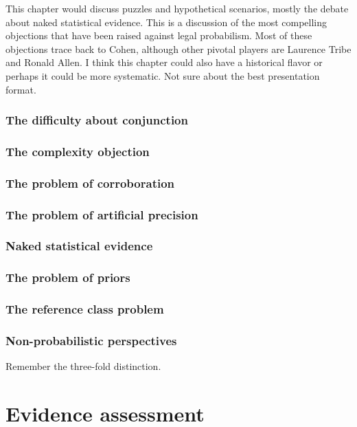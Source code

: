 \documentclass[]{book}
\begin{document}
This chapter would discuss puzzles and hypothetical scenarios, mostly
the debate about naked statistical evidence. This is a discussion of the
most compelling objections that have been raised against legal
probabilism. Most of these objections trace back to Cohen, although
other pivotal players are Laurence Tribe and Ronald Allen. I think this
chapter could also have a historical flavor or perhaps it could be more
systematic. Not sure about the best presentation format.

\section{The difficulty about conjunction}

\section{The complexity objection}

\section{The problem of corroboration}

\section{The problem of artificial precision}

\section{Naked statistical evidence}\label{sec:naked}

\section{The problem of priors}

\section{The reference class problem}

\section{Non-probabilistic perspectives}

Remember the three-fold distinction.

\part{Evidence assessment}
\end{document}
